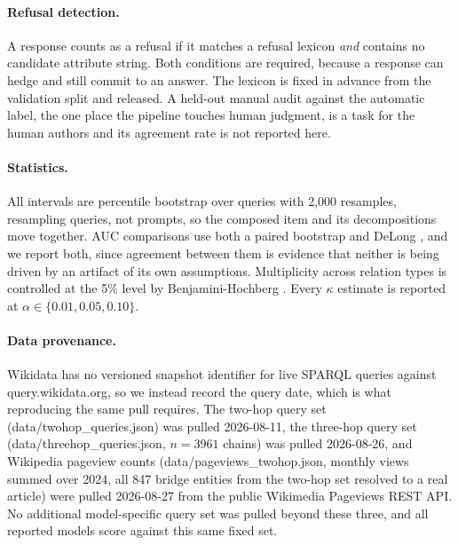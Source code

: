 \documentclass{article}
\newif\ifredflags
\newcommand{\rf}[1]{\ifredflags{\textcolor{red}{\textbf{[MISSING: #1]}}}\fi}
\newcommand{\lit}[1]{\textsf{\footnotesize #1}}
\begin{document}
\paragraph{Refusal detection.} A response counts as a refusal if it matches a refusal lexicon
\emph{and} contains no candidate attribute string. Both conditions are required, because a response
can hedge and still commit to an answer. The lexicon is fixed in advance from the validation split
and released. A held-out manual audit against the automatic label, the one place the pipeline touches
human judgment, is a task for the human authors and its agreement rate is not reported here.
\rf{that agreement rate. It matters more than usual here, because the refusal rate is exactly $0.000$
everywhere and a detection gap in the lexicon is one of the two explanations for that null.}

\paragraph{Statistics.} \rf{seed variation. Every number in this paper comes from a single run.
Bootstrap over queries estimates sampling noise in the evaluation set; it says nothing about variance
from probe initialization, the cross-validation folds that pick the probe penalty, the cross-fitting
folds in BGR-lr, or sparse-autoencoder latent selection. Re-run the full pipeline under at least five
seeds and report seed standard deviation separately from the bootstrap interval. A paired-bootstrap
$p<0.001$ from one run does not establish that the comparison is stable across seeds.}
All intervals are percentile bootstrap over queries with 2{,}000 resamples,
resampling queries, not prompts, so the composed item and its decompositions move together. AUC comparisons use both a paired bootstrap and DeLong \citep{delong1988comparing}, and we
report both, since agreement between them is evidence that neither is being driven by an artifact of
its own assumptions. Multiplicity across relation types is controlled at the 5\% level by
Benjamini-Hochberg \citep{benjamini1995controlling}. Every $\kappa$ estimate is reported at
$\alpha\in\{0.01,0.05,0.10\}$.

\paragraph{Data provenance.} Wikidata has no versioned snapshot identifier for live SPARQL queries
against \lit{query.wikidata.org}, so we instead record the query date, which is what reproducing
the same pull requires. The two-hop query set (\lit{data/twohop\_queries.json}) was pulled
2026-08-11, the three-hop query set (\lit{data/threehop\_queries.json}, $n=3961$ chains) was
pulled 2026-08-26, and Wikipedia pageview counts (\lit{data/pageviews\_twohop.json}, monthly views
summed over 2024, all 847 bridge entities from the two-hop set resolved to a real article) were
pulled 2026-08-27 from the public Wikimedia Pageviews REST API. No additional model-specific query set
was pulled beyond these three, and all reported models score against this same fixed set.
\end{document}

